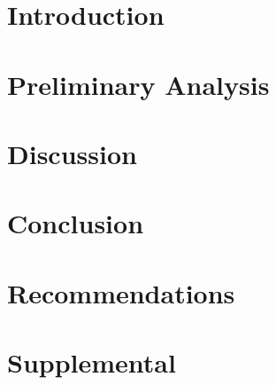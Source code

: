 
\chapter{Introduction}


\chapter{Preliminary Analysis}

\chapter{Discussion}

\chapter{Conclusion}


\chapter{Recommendations}


\chapter{Supplemental}
%